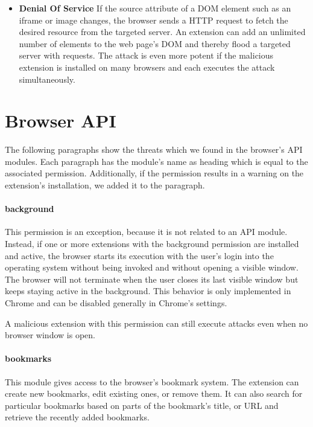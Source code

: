 \begin{itemize}
		\item \textbf{Denial Of Service} If the source attribute of a DOM element such as an iframe or image changes, the browser sends a HTTP request to fetch the desired resource from the targeted server. An extension can add an unlimited number of elements to the web page's DOM and thereby flood a targeted server with requests. The attack is even more potent if the malicious extension is installed on many browsers and each executes the attack simultaneously.
	\end{itemize}
	
\section{Browser API}
	
	The following paragraphs show the threats which we found in the browser's API modules. Each paragraph has the module's name as heading which is equal to the associated permission. Additionally, if the permission results in a warning on the extension's installation, we added it to the paragraph.
	
\newenvironment{permissionwarning}{%
	\setlength\topsep{4pt}
	\setlength\parskip{0pt}
	\itshape
\begin{center}
	}{%
\end{center}
}

\paragraph{background}
	This permission is an exception, because it is not related to an API module. Instead, if one or more extensions with the background permission are installed and active, the browser starts its execution with the user's login into the operating system without being invoked and without opening a visible window. The browser will not terminate when the user closes its last visible window but keeps staying active in the background. This behavior is only implemented in Chrome and can be disabled generally in Chrome's settings.
	
	A malicious extension with this permission can still execute attacks even when no browser window is open.
	
\paragraph{bookmarks} 
	This module gives access to the browser's bookmark system. The extension can create new bookmarks, edit existing ones, or remove them. It can also search for particular bookmarks based on parts of the bookmark's title, or URL and retrieve the recently added bookmarks.
	
